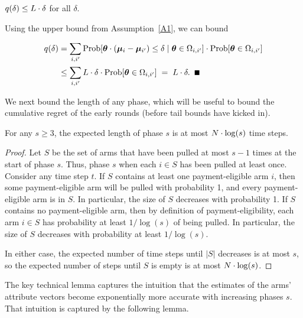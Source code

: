 \begin{lemma} \label{lem:sdelta}
$q(\delta) \leq L \cdot \delta$ for all $\delta$.
\end{lemma}

\begin{emptyproof}
Using the upper bound from Assumption~\ref{A1}, we can bound

\begin{align*}
\AlmostTied{\delta}
& = \sum_{i,i'} \ProbC{\AgV \cdot (\ArmV{i} - \ArmV{i'}) \leq \delta}%
    {\AgV \in \FirstTwo{i}{i'}}
  \cdot \Prob{\AgV \in \FirstTwo{i}{i'}}\\
& \leq \sum_{i,i'} \TieDensity \cdot \delta
    \cdot \Prob{\AgV \in \FirstTwo{i}{i'}}
\; = \; \TieDensity \cdot \delta. \QED
\end{align*}
\end{emptyproof}

We next bound the length of any phase, which will be useful to bound
the cumulative regret of the early rounds
(before tail bounds have kicked in).

\begin{lemma} \label{lem:phase-length}
For any $s\geq 3$, the expected length of phase $s$ is at most
$N \cdot \log(s)$ time steps.
\end{lemma}

\begin{proof}
Let $S$ be the set of arms that have been pulled at most
$s-1$ times at the start of phase $s$.
Thus, phase $s$  when each $i \in S$ has been pulled at least once.
Consider any time step $t$.
If $S$ contains at least one payment-eligible arm $i$,
then some payment-eligible arm will be pulled with probability 1,
and every payment-eligible arm is in $S$.
In particular, the size of $S$ decreases with probability 1.
If $S$ contains no payment-eligible arm,
then by definition of payment-eligibility,
each arm $i \in S$ has probability at least $1/\log(s)$ of being pulled.
In particular, the size of $S$ decreases with probability at least $1/\log(s)$.

In either case, the expected number of time steps until
$|S|$ decreases is at most $s$,
so the expected number of steps until $S$ is empty is at most
$N \cdot \log(s)$.
\end{proof}
                  
The key technical lemma captures the intuition that
the estimates of the arms' attribute vectors become
exponentially more accurate with increasing phases $s$.
That intuition is captured by the following lemma.

